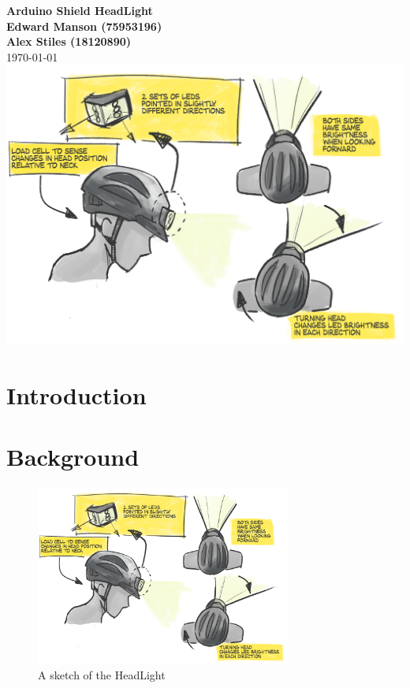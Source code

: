 \documentclass[twoside]{article}
\begin{document}

\begin{titlingpage}
    {\centering
    \vspace*{3cm}
    {\LARGE\textbf{Arduino Shield HeadLight}\\}
    \vspace{1cm}
    {\textbf{Edward Manson (75953196)}\\}
    {\textbf{Alex Stiles (18120890)}\\}
    \vspace{1cm}
    {\today}
    \vfill
    \noindent
    \includegraphics[width=0.75\linewidth]{headlamp-project-concept.png}
    \vfill}
\end{titlingpage}

\tableofcontents
\listoffigures
\listoftables
\lstlistoflistings
\newpage


\section{Introduction}

\section{Background}
    \noindent
    \begin{figure}[H]
        \centering
        \includegraphics[width=0.75\textwidth]{headlamp-project-concept.png}
        \caption{A sketch of the HeadLight}
        \label{fig:sketch}
    \end{figure}
\end{document}
